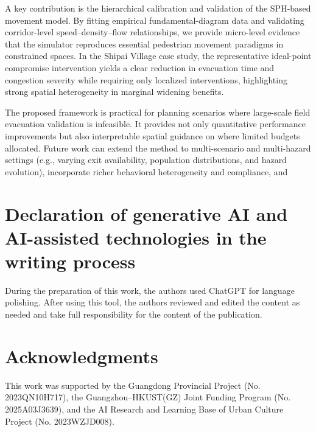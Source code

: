 \documentclass[preprint,12pt]{elsarticle}
\newif\ifanonymous
\newcommand{\revb}[1]{{\color{blue}{#1}}}
\begin{document}
A key contribution is the hierarchical calibration and validation of the SPH-based movement model. By fitting empirical
fundamental-diagram data and validating corridor-level speed--density--flow relationships, we provide micro-level evidence
that the simulator reproduces essential pedestrian movement paradigms in constrained spaces. \revb{At the village scale,
paired multi-seed simulations and free-flow plausibility checks provide scenario-based consistency evidence rather than direct
validation of absolute clearance times.} In the Shipai Village case study, the representative ideal-point compromise intervention yields a clear
reduction in evacuation time and congestion severity while requiring only localized interventions, highlighting strong
spatial heterogeneity in marginal widening benefits. \revb{The finite-budget Pareto front provides a lowest-cost nonzero intervention, an ideal-point compromise, and an evacuation-priority solution, while the sensitivity analyses show that objective-space performance is comparatively
robust but the exact road selection retains uncertainty.}

The proposed framework is practical for planning scenarios where large-scale field evacuation validation is infeasible. It
provides not only quantitative performance improvements but also interpretable spatial guidance on where limited budgets
allocated. \revb{The measured computational cost positions the framework as an effective offline planning tool.} Future work can extend the method to multi-scenario and multi-hazard settings (e.g., varying exit
availability, population distributions, and hazard evolution), incorporate richer behavioral heterogeneity and compliance,
and \revb{extend the multi-seed Pareto analysis, evaluate computational scaling across larger domains, and validate dynamically coupled multi-hazard scenarios.}

\section*{Declaration of generative AI and AI-assisted technologies in the writing process}
During the preparation of this work, the authors used ChatGPT for language polishing. After using this tool, the authors reviewed and edited the content as needed and take full responsibility for the content of the publication.

\ifanonymous
\else
\section*{Acknowledgments}
This work was supported by the Guangdong Provincial Project (No. 2023QN10H717),
the Guangzhou--HKUST(GZ) Joint Funding Program (No. 2025A03J3639),
and the AI Research and Learning Base of Urban Culture Project (No. 2023WZJD008).
\fi

\end{document}
